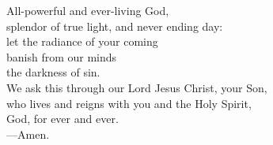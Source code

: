 \prayer


\begin{prayerverse}
All-powerful and ever-living God,\\
splendor of true light, and never ending day:\\
let the radiance of your coming\\
banish from our minds\\
the darkness of sin.\\
We ask this through our Lord Jesus Christ, your Son,\\
who lives and reigns with you and the Holy Spirit,\\
God, for ever and ever.\\
{\color{red}---\thinspace}Amen.
\end{prayerverse}

